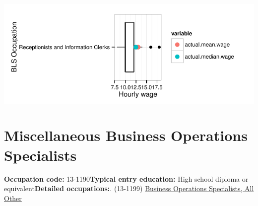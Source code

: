 \documentclass[a4paper,10pt]{article}\usepackage[]{graphicx}\usepackage[]{color}
\makeatletter
\def\maxwidth{ %
  \ifdim\Gin@nat@width>\linewidth
    \linewidth
  \else
    \Gin@nat@width
  \fi
}
\makeatother
\begin{document}
{\centering \includegraphics[width=\maxwidth]{figure/unnamed-chunk-230} 

}


\newpage\section{Miscellaneous Business Operations Specialists}\textbf{Occupation code:} 13-1190\newline\textbf{Typical entry education:} High school diploma or equivalent\newline\textbf{Detailed occupations:}. (13-1199)  \href{http://www.bls.gov/oes/current/oes131199.htm}{Business Operations Specialists, All Other}\newline%
\end{document}
